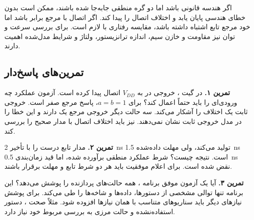 اگر هندسه قانونی باشد اما دو گره منطقی جابه‌جا شده باشند، ممکن است
 بدون خطای هندسی پایان یابد و  اختلاف اتصال را پیدا کند.
اگر اتصال با مرجع برابر باشد اما خود مرجع تابع اشتباه داشته باشد، مقایسه رفتاری
با  لازم است. برای بررسی سرعت و توان نیز مقاومت و خازن سیم،
اندازه ترانزیستور، ولتاژ و شرایط مدل‌شده اهمیت دارند.

\subsection{تمرین‌های پاسخ‌دار }
\textbf{تمرین ۱.} در گیت ، خروجی در  به \(V_{DD}\) اتصال
پیدا کرده است. آزمون عملکرد چه ورودی‌ای را باید حتماً اعمال کند؟
برای \(a=b=1\)، پاسخ مرجع صفر است. خروجی ثابت یک اختلاف را آشکار می‌کند.
سه حالت دیگر خروجی مرجع یک دارند و این خطا را در مدل خروجی ثابت نشان نمی‌دهند.
 نیز باید اختلاف اتصال با مدار صحیح را بررسی کند.

\textbf{تمرین ۲.} مدار تابع درست را با تأخیر \qty{2}{\nano\second} تولید می‌کند،
ولی مهلت داده‌شده \qty{1.5}{\nano\second} است. نتیجه چیست؟
شرط عملکرد منطقی برآورده شده، اما قید زمان‌بندی \qty{0.5}{\nano\second} نقض شده است.
برای اعلام موفقیت باید هر دو شرط تابع و مهلت برقرار باشند.

\textbf{تمرین ۳.} آیا یک آزمون موفق برنامه ، همه حالت‌های پردازنده
را پوشش می‌دهد؟ این برنامه تنها توالی مشخصی از دستورها، داده‌ها و شاخه‌ها را طی
می‌کند. برای پوشش نیازهای دیگر باید سناریوهای متناسب با همان نیازها افزوده شود.
مثلاً صحت ، دستور استفاده‌نشده و حالت مرزی  به بررسی مربوط خود نیاز دارد.
\clearpage
